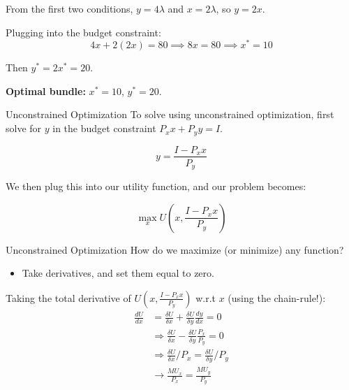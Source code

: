 \documentclass{beamer}
\begin{document}
\begin{frame}

  \bigskip
  From the first two conditions, $y = 4\lambda$ and $x = 2\lambda$, so $y = 2x$.

  \bigskip
  Plugging into the budget constraint:
  $$
    4x + 2(2x) = 80 \implies 8x = 80 \implies x^* = 10
  $$

  \bigskip
  Then $y^* = 2x^* = 20$.

  \bigskip
  \textbf{Optimal bundle:} $x^* = 10$, $y^* = 20$.
\end{frame}

\begin{frame}{Unconstrained Optimization}
  To solve using unconstrained optimization, first solve for $y$ in the budget constraint $P_x x + P_y y = I$.

  $$
    y  = \frac{I - P_x x}{P_y} 
  $$

  \bigskip
  We then plug this into our utility function, and our problem becomes:

  $$
    \max_x U(x,\frac{I - P_x x}{P_y}) 
  $$
\end{frame}

\begin{frame}{Unconstrained Optimization}
  How do we maximize (or minimize) any function? 
  \begin{itemize}
    \item Take derivatives, and set them equal to zero.
  \end{itemize}
  Taking the total derivative of $U(x,\frac{I - P_x x}{P_y})$ w.r.t $x$ (using the chain-rule!):
  \begin{align*}
    \frac{dU}{dx} & =\frac{\delta U}{\delta x} +\frac{\delta U}{\delta y}\frac{dy}{dx} = 0 \\
    &\Rightarrow \frac{\delta U}{\delta x} -\frac{\delta U}{\delta y}\frac{P_x}{P_y} =0 \\
    &\Rightarrow \frac{\delta U}{\delta x}/{P_x} = \frac{\delta U}{\delta y} /{P_y} \\
    &\rightarrow \frac{MU_x}{P_x} = \frac{MU_y} {P_y}
  \end{align*}
\end{frame}
\end{document}
